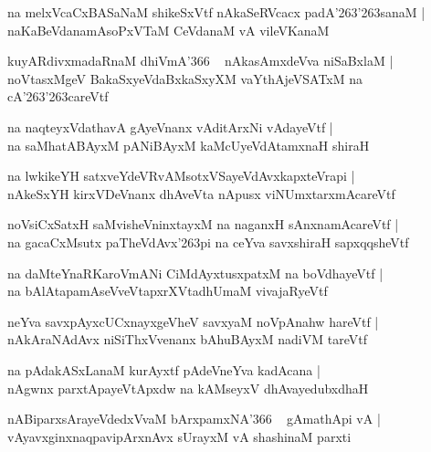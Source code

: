 \documentclass[twoside,12pt,openright]{book}
\def\S{\char'263}
\newcounter{shloka}[chapter]
\begin{document}
\begin{shloka}
na melxVcaCxBASaNaM shikeSxVtf nAkaSeRVcacx padA\S\S sanaM |\\
naKaBeVdanamAsoPxVTaM CeVdanaM vA vileVKanaM 
\end{shloka}

\begin{shloka}
kuyARdivxmadaRnaM dhiVmA\char'366 ~ nAkasAmxdeVva niSaBxlaM |\\
noVtasxMgeV BakaSxyeVdaBxkaSxyXM vaYthAjeVSATxM na cA\S\S careVtf
\end{shloka}

\begin{shloka}
na naqteyxVdathavA gAyeVnanx vAditArxNi vAdayeVtf |\\
na saMhatABAyxM pANiBAyxM kaMcUyeVdAtamxnaH shiraH
\end{shloka}

\begin{shloka}
na lwkikeYH satxveYdeVRvAMsotxVSayeVdAvxkapxteVrapi |\\
nAkeSxYH kirxVDeVnanx dhAveVta nApusx viNUmxtarxmAcareVtf 
\end{shloka}

\begin{shloka}
noVsiCxSatxH saMvisheVninxtayxM  na naganxH sAnxnamAcareVtf |\\
na gacaCxMsutx paTheVdAvx\S pi na ceYva savxshiraH sapxqqsheVtf 
\end{shloka}

\begin{shloka}
na daMteYnaRKaroVmANi CiMdAyxtusxpatxM na boVdhayeVtf |\\
na bAlAtapamAseVveVtapxrXVtadhUmaM vivajaRyeVtf 
\end{shloka}

\begin{shloka}
neYva savxpAyxcUCxnayxgeVheV savxyaM noVpAnahw hareVtf |\\
nAkAraNAdAvx niSiThxVvenanx bAhuBAyxM nadiVM tareVtf
\end{shloka}

\begin{shloka}
na pAdakASxLanaM kurAyxtf pAdeVneYva kadAcana |\\
nAgwnx parxtApayeVtApxdw na kAMseyxV dhAvayedubxdhaH
\end{shloka}

\begin{shloka}
nABiparxsArayeVdedxVvaM bArxpamxNA\char'366 ~ gAmathApi vA |\\
vAyavxginxnaqpavipArxnAvx sUrayxM vA shashinaM parxti 
\end{shloka}
\end{document}

